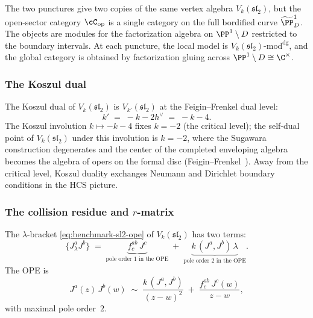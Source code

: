\begin{remark}
\label{rem:benchmark-two-copies}
The two punctures give two copies of the same vertex algebra
$V_k(\mathfrak{sl}_2)$, but the open-sector category
$\cC_{\mathrm{op}}$ is a single category on the full bordified
curve $\widetilde{\PP}^1_D$. The objects are modules for the
factorization algebra on $\PP^1 \setminus D$ restricted to
the boundary intervals. At each puncture, the local model is
$V_k(\mathfrak{sl}_2)\text{-mod}^{\mathrm{dg}}$, and the global
category is obtained by factorization gluing across
$\PP^1 \setminus D \cong \C^\times$.
\end{remark}


\subsubsection{The Koszul dual}
\label{subsubsec:benchmark-koszul-dual}

The Koszul dual of $V_k(\mathfrak{sl}_2)$ is
$V_{k'}(\mathfrak{sl}_2)$ at the Feigin--Frenkel dual level:
\begin{equation}\label{eq:benchmark-koszul-dual-level}
 k'
 \;=\;
 -k - 2h^\vee
 \;=\;
 -k - 4.
\end{equation}
The Koszul involution $k \mapsto -k-4$ fixes $k = -2$
(the critical level); the self-dual point of
$V_k(\mathfrak{sl}_2)$ under this involution is $k = -2$, where
the Sugawara construction degenerates and the center of the
completed enveloping algebra becomes the algebra of opers on the
formal disc (Feigin--Frenkel~\cite{FBZ04}). Away from
the critical level, Koszul duality exchanges Neumann and Dirichlet
boundary conditions in the HCS picture.


\subsubsection{The collision residue and $r$-matrix}
\label{subsubsec:benchmark-r-matrix}

The $\lambda$-bracket
\eqref{eq:benchmark-sl2-ope}
of $V_k(\mathfrak{sl}_2)$ has two terms:
\[
 \{J^a_\lambda J^b\}
 \;=\;
 \underbrace{f^{ab}_c\, J^c}_{\text{pole order }1
 \text{ in the OPE}}
 \;+\;
 \underbrace{k\,(J^a, J^b)\,\lambda}_{\text{pole order }2
 \text{ in the OPE}}.
\]
The OPE is
\begin{equation}\label{eq:benchmark-sl2-ope-explicit}
 J^a(z)\, J^b(w)
 \;\sim\;
 \frac{k\,(J^a, J^b)}{(z-w)^2}
 \;+\;
 \frac{f^{ab}_c\, J^c(w)}{z-w},
\end{equation}
with maximal pole order~$2$.

